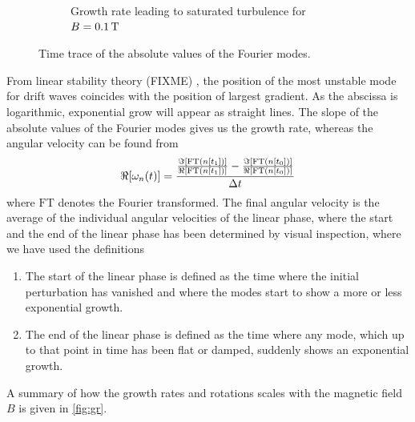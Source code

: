 \begin{figure}[h!]
\begin{subfigure}[h]{1\textwidth}
        \label{fig:fourierUnstable}
        \caption{Growth rate leading to saturated turbulence for $B=0.1\, \text{T}$}
    \end{subfigure}
    \caption{Time trace of the absolute values of the Fourier modes.}
    \label{fig:fourierDens}
\end{figure}
%
From linear stability theory (FIXME)
, the position of the most unstable mode for drift waves coincides with the position of largest gradient.
As the abscissa is logarithmic, exponential grow will appear as straight lines.
The slope of the absolute values of the Fourier modes gives us the growth rate, whereas the angular velocity can be found from
%
\begin{align*}
    \Re[\omega_n(t)] =
    \frac{
        \frac{\Im[\text{FT}(n[t_1])]}{\Re[\text{FT}(n[t_1])]} -
        \frac{\Im[\text{FT}(n[t_0])]}{\Re[\text{FT}(n[t_0])]}
    }{\Delta t}
\end{align*}
%
where $\text{FT}$ denotes the Fourier transformed.
The final angular velocity is the average of the individual angular velocities of the linear phase, where the start and the end of the linear phase has been determined by visual inspection, where we have used the definitions
%
\begin{enumerate}
    \item The start of the linear phase is defined as the time where the initial perturbation has vanished and where the modes start to show a more or less exponential growth.
    \item The end of the linear phase is defined as the time where any mode, which up to that point in time has been flat or damped, suddenly shows an exponential growth.
\end{enumerate}
%
A summary of how the growth rates and rotations scales with the magnetic field $B$ is given in \cref{fig:gr}.
%
